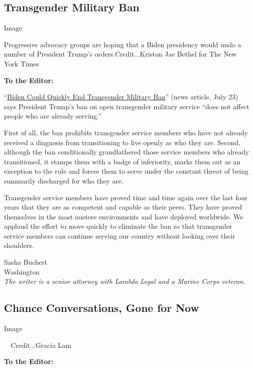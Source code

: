 \hypertarget{transgender-military-ban}{%
\subsection{Transgender Military Ban}\label{transgender-military-ban}}

Image

Progressive advocacy groups are hoping that a Biden presidency would
undo a number of President Trump's orders.Credit...Kriston Jae Bethel
for The New York Times

\textbf{To the Editor:}

``\href{https://www.nytimes3xbfgragh.onion/2020/07/22/us/politics/military-transgender-trump-biden.html}{Biden
Could Quickly End Transgender Military Ban}'' (news article, July 23)
says President Trump's ban on open transgender military service ``does
not affect people who are already serving.''

First of all, the ban prohibits transgender service members who have not
already received a diagnosis from transitioning to live openly as who
they are. Second, although the ban conditionally grandfathered those
service members who already transitioned, it stamps them with a badge of
inferiority, marks them out as an exception to the rule and forces them
to serve under the constant threat of being summarily discharged for who
they are.

Transgender service members have proved time and time again over the
last four years that they are as competent and capable as their peers.
They have proved themselves in the most austere environments and have
deployed worldwide. We applaud the effort to move quickly to eliminate
the ban so that transgender service members can continue serving our
country without looking over their shoulders.

Sasha Buchert\\
Washington\\
\emph{The writer is a senior attorney with Lambda Legal and a Marine
Corps veteran.}

\hypertarget{chance-conversations-gone-for-now}{%
\subsection{Chance Conversations, Gone for
Now}\label{chance-conversations-gone-for-now}}

Image

~~Credit...Gracia Lam

\textbf{To the Editor:}

